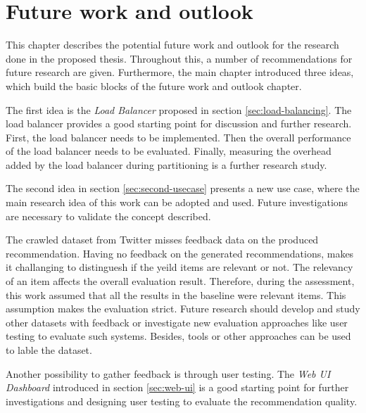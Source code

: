 \chapter{Future work and outlook}
\label{chap:future-work}
This chapter describes the potential future work and outlook for the research done in the proposed thesis. Throughout this, a number of recommendations for future research are given. Furthermore, the main chapter introduced three ideas, which build the basic blocks of the future work and outlook chapter. 


The first idea is the \emph{Load Balancer} proposed in section \ref{sec:load-balancing}. The load balancer provides a good starting point for discussion and further research. First, the load balancer needs to be implemented. Then the overall performance of the load balancer needs to be evaluated. Finally, measuring the overhead added by the load balancer during partitioning is a further research study.


The second idea in section \ref{sec:second-usecase} presents a new use case, where the main research idea of this work can be adopted and used. Future investigations are necessary to validate the concept described.


The crawled dataset from Twitter misses feedback data on the produced recommendation. Having no feedback on the generated recommendations, makes it challanging to distinguesh if the yeild items are relevant or not. The relevancy of an item affects the overall evaluation result. Therefore, during the assessment, this work assumed that all the results in the baseline were relevant items. This assumption makes the evaluation strict. Future research should develop and study other datasets with feedback or investigate new evaluation approaches like user testing to evaluate such systems. Besides, tools or other approaches can be used to lable the dataset.


Another possibility to gather feedback is through user testing. The \emph{Web UI Dashboard} introduced in section \ref{sec:web-ui} is a good starting point for further investigations and designing user testing to evaluate the recommendation quality.


